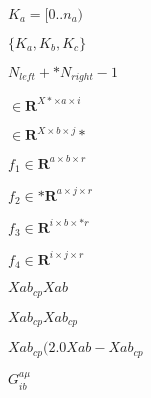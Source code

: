 \documentclass{article}
\begin{document}
$ K_a = [0..n_a) $
\pagebreak

$ \{ K_a, K_b, K_c \} $
\pagebreak

$ N_{left} + *N_{right} - 1 $
\pagebreak

$ \in \mathbf{R}^{X *\times a \times i} $
\pagebreak

$ \in \mathbf{R}^{X \times b \times j} *$
\pagebreak

$ f_1 \in \mathbf{R}^{a\times b \times r}$
\pagebreak

$ f_2 \in *\mathbf{R}^{a\times j \times r}$
\pagebreak

$ f_3 \in \mathbf{R}^{i\times b \times *r}$
\pagebreak

$ f_4 \in \mathbf{R}^{i\times j \times r}$
\pagebreak

$ Xab_{cp} Xab $
\pagebreak

$ Xab_{cp} Xab_{cp}$
\pagebreak

$ Xab_{cp} (2.0 Xab - Xab_{cp} $
\pagebreak

$ G^{a \mu}_{ib} $
\pagebreak
\end{document}
